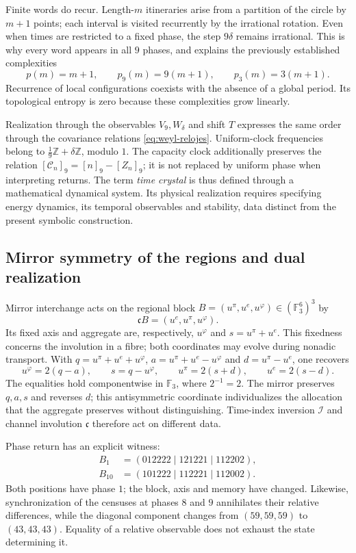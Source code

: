Finite words do recur. Length-\(m\) itineraries
arise from a partition of the circle by \(m+1\) points; each
interval is visited recurrently by the irrational rotation. Even
when times are restricted to a fixed phase, the step \(9\delta\) remains
irrational. This is why every word appears in all
\(9\) phases, and explains the previously established complexities
\[
 p(m)=m+1,\qquad p_9(m)=9(m+1),\qquad p_3(m)=3(m+1).
\]
Recurrence of local configurations coexists with the absence of a
global period. Its topological entropy is zero because these complexities
grow linearly.

Realization through the observables \(V_9,W_\delta\) and shift
\(T\) expresses the same order through the covariance relations
\eqref{eq:weyl-relojes}. Uniform-clock frequencies belong to
\(\frac19\mathbb Z+\delta\mathbb Z\), modulo \(1\). The capacity
clock additionally preserves the relation
\([\mathcal C_n]_9=[n]_9-[Z_n]_9\); it is not replaced by uniform phase
when interpreting returns. The term \emph{time crystal} is thus
defined through a mathematical dynamical system. Its physical realization
requires specifying energy dynamics, its temporal observables
and stability, data distinct from the present symbolic construction.

\subsection{Mirror symmetry of the regions and dual realization}
\label{mono-ampl:regiones}

Mirror interchange acts on the regional block
\(B=(u^\pi,u^e,u^\varphi)\in(\mathbb F_3^6)^3\) by
\[
 \mathfrak cB=(u^e,u^\pi,u^\varphi).
\]
Its fixed axis and aggregate are, respectively, \(u^\varphi\) and
\(s=u^\pi+u^e\). This fixedness concerns the involution in a fibre;
both coordinates may evolve during nonadic transport.
With \(q=u^\pi+u^e+u^\varphi\),
\(a=u^\pi+u^e-u^\varphi\) and \(d=u^\pi-u^e\), one recovers
\[
 u^\varphi=2(q-a),\qquad s=q-u^\varphi,\qquad
 u^\pi=2(s+d),\qquad u^e=2(s-d).
\]
The equalities hold componentwise in \(\mathbb F_3\), where
\(2^{-1}=2\). The mirror preserves \(q,a,s\) and reverses \(d\); this
antisymmetric coordinate individualizes the allocation that the aggregate preserves
without distinguishing. Time-index inversion \(\mathcal I\) and
channel involution \(\mathfrak c\) therefore act on
different data.

Phase return has an explicit witness:
\[
 \begin{aligned}
 B_1&=(012222\mid121221\mid112202),\\
 B_{10}&=(101222\mid112221\mid112002).
 \end{aligned}
\]
Both positions have phase \(1\); the block, axis and memory have
changed. Likewise, synchronization of the censuses at phases \(8\) and
\(9\) annihilates their relative differences, while the diagonal component
changes from \((59,59,59)\) to \((43,43,43)\). Equality of a relative observable
does not exhaust the state determining it.

